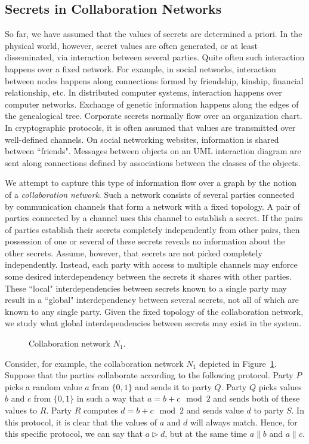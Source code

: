 \documentclass{llncs}
\begin{document}
\subsection{Secrets in Collaboration Networks}

So far, we have assumed that the values of secrets are determined a priori. In the physical world, however, secret values are often generated, or at least disseminated, via interaction between several parties. Quite often such interaction happens over a fixed network. For example, in social networks, interaction between nodes happens along connections formed by friendship, kinship, financial relationship, etc.  In distributed computer systems, interaction happens over computer networks. Exchange of genetic information happens along the edges of the genealogical tree. Corporate secrets normally flow over an organization chart. In cryptographic protocols, it is often assumed that values are transmitted over well-defined channels. On social networking websites, information is shared between ``friends". Messages between objects on an UML interaction diagram are sent along connections defined by associations between the classes of the objects.

We attempt to capture this type of information flow over a graph by the notion of a {\em collaboration network}. Such a network consists of several parties connected by communication channels that form a network with a fixed topology. A pair of parties connected by a channel uses this channel to establish a secret. If the pairs of parties establish their secrets completely independently from other pairs, then possession of one or several of these secrets reveals no information about the other secrets. Assume, however, that secrets are not picked completely independently. Instead, each party with access to multiple channels may enforce some desired interdependency between the secrets it shares with other parties. These ``local" interdependencies between secrets known to a single party may result in a ``global" interdependency between several secrets, not all of which are known to any single party. Given the fixed topology of the collaboration network, we study what global interdependencies between secrets may exist in the system.
\begin{figure}[htbp]
   \centering
   \caption{Collaboration network $N_1$.}
   \label{computation_graph}
\end{figure}

Consider, for example, the collaboration network $N_1$ depicted in Figure~\ref{computation_graph}.  Suppose that the parties collaborate according to the following protocol.  Party $P$ picks a random value $a$ from $\{0,1\}$ and sends it to party $Q$. Party $Q$ picks values $b$ and $c$ from $\{0,1\}$ in such a way that $a=b+c \mod 2$ and sends both of these values to $R$. Party $R$ computes $d=b+c \mod 2$ and sends value $d$ to party $S$. In this protocol, it is clear that the values of $a$ and $d$ will always match. Hence, for this specific protocol, we can say that $a\rhd d$, but at the same time $a\parallel b$ and $a\parallel c$.
\end{document}
